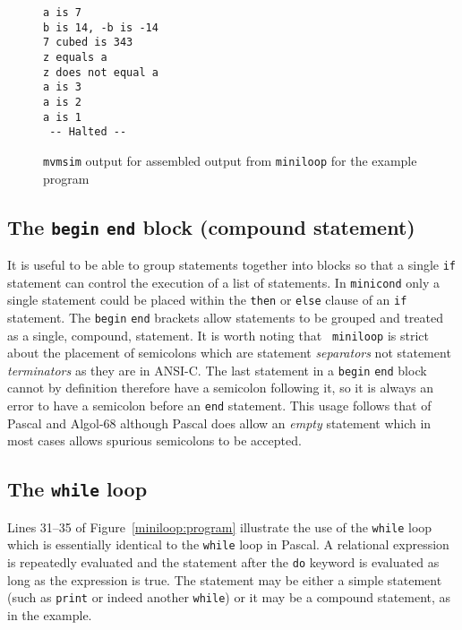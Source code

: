 \begin{figure}
\small
\begin{verbatim}
a is 7
b is 14, -b is -14
7 cubed is 343
z equals a
z does not equal a
a is 3
a is 2
a is 1
 -- Halted --
\end{verbatim}
\caption{{\tt mvmsim} output for assembled output from {\tt miniloop} for the example program}
\label{miniloop:output}
\end{figure}

\subsection{The {\tt begin} {\tt end} block (compound statement)} It is
useful to be able to group statements together into blocks so that a
single  {\tt if} statement can control the execution of a list of
statements. In {\tt minicond} only a single statement could be placed
within the {\tt then} or {\tt else} clause of an {\tt if} statement. The
{\tt begin} {\tt end} brackets allow statements to be grouped and
treated as a single, compound, statement. It is worth noting that {\tt
miniloop} is strict about the placement of semicolons which are
statement {\em separators} not statement {\em terminators} as they are
in ANSI-C.  The last statement in a {\tt begin} {\tt end} block cannot
by definition therefore have  a semicolon following it, so it is always
an error to have a semicolon before an {\tt end} statement. This usage
follows that of Pascal and Algol-68 although Pascal does allow an {\em
empty} statement which in most cases allows spurious semicolons to be
accepted.

\subsection{{The \tt while} loop} Lines 31--35 of
Figure~\ref{miniloop:program} illustrate the use of the {\tt while} loop
which is essentially identical to the {\tt while} loop in Pascal. A
relational expression is repeatedly evaluated and the statement after the {\tt do}
keyword is evaluated as long as the expression is {\sc true}.
The statement may be either a simple statement (such as  {\tt print} or
indeed another {\tt while}) or it may be a compound statement, as in the
example.

